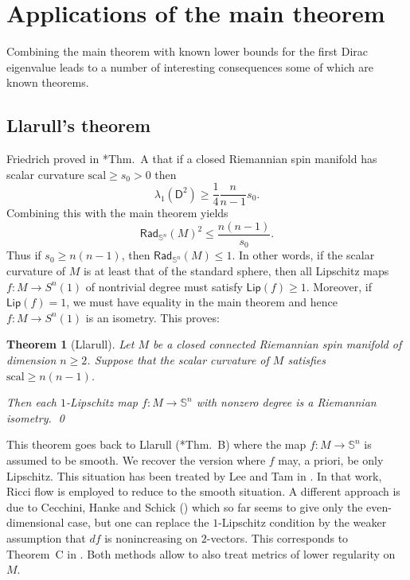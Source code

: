 \documentclass[11pt,reqno]{amsart}
\newcommand{\RadSn}{\mathsf{Rad}_{\Sn}}
\newcommand{\Lip}{\mathsf{Lip}}
\newcommand{\Sn}{\mathbb{S}^n}
\newcommand{\D}{\mathsf{D}}
\newcommand{\scal}{\mathrm{scal}}
\newcommand{\<}{\langle}
\renewcommand{\>}{\rangle}
\newtheorem{theorem}{Theorem}
\theoremstyle{definition}
\begin{document}
\section{Applications of the main theorem}
\label{sec.applications} 

Combining the main theorem with known lower bounds for the first Dirac eigenvalue leads to a number of interesting consequences some of which are known theorems.

\subsection{Llarull's theorem}
\label{subsec.appl.Llarull}
Friedrich proved in \cite{F}*{Thm.~A} that if a closed Riemannian spin manifold has scalar curvature $\scal\ge s_0>0$ then 
\begin{equation}
\lambda_1(\D^2) \ge \frac14\frac{n}{n-1}s_0 .
\label{eq.Friedrich}
\end{equation}
Combining this with the main theorem yields
\begin{equation}
\RadSn(M)^2 \le \frac{n(n-1)}{s_0}.
\label{eq.Llarull}
\end{equation}
Thus if $s_0\ge n(n-1)$, then $\RadSn(M)\le1$.
In other words, if the scalar curvature of $M$ is at least that of the standard sphere, then all Lipschitz maps $f\colon M\to S^n(1)$ of nontrivial degree must satisfy $\Lip(f)\ge1$.
Moreover, if $\Lip(f)=1$, we must have equality in the main theorem and hence $f\colon M\to S^n(1)$ is an isometry.
This proves:

\begin{theorem}[Llarull]
Let $M$ be a closed connected Riemannian spin manifold of dimension $n\ge2$.
Suppose that the scalar curvature of $M$ satisfies $\scal\ge n(n-1)$.

Then each $1$-Lipschitz map $f\colon M\to \Sn$ with nonzero degree is a Riemannian isometry.
\hfill\qed
\end{theorem}

This theorem goes back to Llarull (\cite{Ll}*{Thm.~B}) where the map $f\colon M\to\Sn$ is assumed to be smooth.
We recover the version where $f$ may, a priori, be only Lipschitz.
This situation has been treated by Lee and Tam in \cite{LT}.
In that work, Ricci flow is employed to reduce to the smooth situation. 
A different approach is due to Cecchini, Hanke and Schick (\cite{CHS}) which so far seems to give only the even-dimensional case, but one can replace the $1$-Lipschitz condition by the weaker assumption that $df$ is nonincreasing on $2$-vectors.
This corresponds to Theorem~C in \cite{Ll}.
Both methods allow to also treat metrics of lower regularity on $M$.
\end{document}
